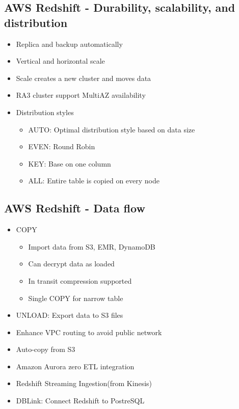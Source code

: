 \documentclass[../../main.tex]{subfiles}
\begin{document}
\subsection{AWS Redshift - Durability, scalability, and distribution}
\begin{itemize}
    \item Replica and backup automatically
    \item Vertical and horizontal scale
    \item Scale creates a new cluster and moves data
    \item RA3 cluster support MultiAZ availability
    \item Distribution styles
    \begin{itemize}
        \item AUTO: Optimal distribution style based on data size
        \item EVEN: Round Robin
        \item KEY: Base on one column
        \item ALL: Entire table is copied on every node
    \end{itemize}
\end{itemize}

\subsection{AWS Redshift - Data flow}
\begin{itemize}
    \item COPY
    \begin{itemize}
        \item Import data from S3, EMR, DynamoDB
        \item Can decrypt data as loaded
        \item In transit compression supported
        \item Single COPY for narrow table
    \end{itemize}
    \item UNLOAD: Export data to S3 files
    \item Enhance VPC routing to avoid public network
    \item Auto-copy from S3
    \item Amazon Aurora zero ETL integration
    \item Redshift Streaming Ingestion(from Kinesis)
    \item DBLink: Connect Redshift to PostreSQL
\end{itemize}
\end{document}
